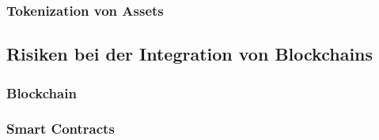 \subsubsection{Tokenization von Assets}
\label{sec:Tokenization}









\subsection{Risiken bei der Integration von Blockchains}
\cite[p.~17]{pirafelnerblockchaintechnologie}

\subsubsection{Blockchain}

\subsubsection{Smart Contracts}



